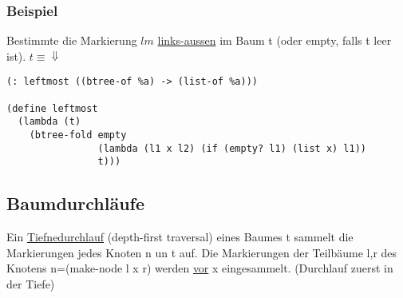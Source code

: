 \documentclass[a4paper,12pt]{article}
\begin{document}
\subsubsection{Beispiel}
Bestimmte die Markierung $lm$ \uline{links-aussen} im Baum t (oder empty, falls t leer ist).
$t \equiv \Downarrow$\\ 
\begin{lstlisting}[style=customc]
(: leftmost ((btree-of %a) -> (list-of %a)))

(define leftmost
  (lambda (t)
    (btree-fold empty
                (lambda (l1 x l2) (if (empty? l1) (list x) l1))
                t)))
\end{lstlisting}

\subsection{Baumdurchläufe}
Ein \uline{Tiefnedurchlauf} (depth-first traversal) eines Baumes t sammelt die Markierungen jedes Knoten n un t auf. Die Markierungen der Teilbäume l,r des Knotens n=(make-node l x r) werden \uline{vor} x eingesammelt. (Durchlauf zuerst in der Tiefe)
\end{document}
